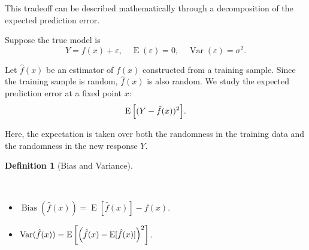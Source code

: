 \documentclass[
  letterpaper,
  DIV=11,
  numbers=noendperiod]{scrreprt}
\providecommand{\tightlist}{%
  \setlength{\itemsep}{0pt}\setlength{\parskip}{0pt}}
\newcommand{\Exp}{\operatorname{E}}
\newcommand{\Var}{\operatorname{Var}}
\theoremstyle{definition}
\newtheorem{definition}{Definition}[chapter]
\theoremstyle{definition}
\theoremstyle{plain}
\theoremstyle{plain}
\theoremstyle{remark}
\begin{document}
This tradeoff can be described mathematically through a decomposition of
the expected prediction error.

Suppose the true model is \[
Y=f(x)+\varepsilon,\quad\Exp(\varepsilon)=0,\quad \Var(\varepsilon)=\sigma^2.
\]

Let \(\hat f(x)\) be an estimator of \(f(x)\) constructed from a
training sample. Since the training sample is random, \(\hat f(x)\) is
also random. We study the expected prediction error at a fixed point
\(x\): \[
\Exp\qty[(Y-\hat f(x))^2].
\]

Here, the expectation is taken over both the randomness in the training
data and the randomness in the new response \(Y\).

\begin{definition}[Bias and
Variance]\protect\hypertarget{def-}{}\label{def-}

~

\begin{itemize}
\tightlist
\item
  \(\operatorname{Bias}(\hat f(x))=\Exp[\hat f(x)]-f(x)\).
\item
  \(\Var(\hat f(x))=\Exp\qty[\qty(\hat f(x)-\Exp[\hat f(x)])^2]\).
\end{itemize}

\end{definition}
\end{document}

